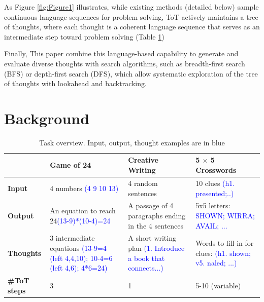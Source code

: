 \documentclass{article}
\begin{document}
As Figure \ref{fig:Figure1} illustrates, while existing methods (detailed below) sample continuous language sequences for problem solving, ToT actively maintains a tree of thoughts, where each thought is a coherent language sequence that serves as an intermediate step toward problem solving (Table \ref{tab:Table1})

Finally, This paper combine this language-based capability to generate and evaluate diverse thoughts with search algorithms, such as breadth-first search (BFS) or depth-first search (DFS), which allow systematic exploration of the tree of thoughts with lookahead and backtracking.


\section{Background}




\begin{table}[h]
    \centering
    \begin{tabularx}{\textwidth}{|X|X|X|X|}
        \hline
        & \textbf{Game of 24} & \textbf{Creative Writing} & \textbf{5 $\times$ 5 Crosswords} \\
        \hline
        \textbf{Input} & 4 numbers \textcolor{blue}{(4 9 10 13)} & 4 random sentences & 10 clues \textcolor{blue}{(h1. presented;..)}\\
        \hline
        \textbf{Output} & An equation to reach 24\textcolor{blue}{(13-9)*(10-4)=24} & A passage of 4 paragraphs ending in the 4 sentences & 5x5 letters: \textcolor{blue}{SHOWN; WIRRA; AVAIL; ...} \\
        \hline
        \textbf{Thoughts} & 3 intermediate equations \textcolor{blue}{(13-9=4 (left 4,4,10); 10-4=6 (left 4,6); 4*6=24)} & A short writing plan \textcolor{blue}{(1. Introduce a book that connects...)} & Words to fill in for clues: \textcolor{blue}{(h1. shown; v5. naled; ...)} \\
        \hline
        \textbf{\#ToT steps} & 3 & 1 & 5-10 (variable) \\
        \hline
        \end{tabularx}

        \caption{Task overview. Input, output, thought examples are in blue}
        \label{tab:Table1}
\end{table}
\end{document}
